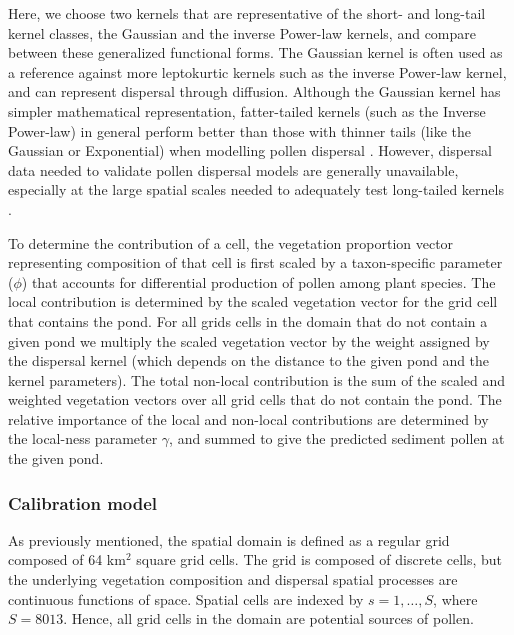 \documentclass[12pt]{article}
\begin{document}
Here, we choose two kernels that are representative of the short- and
long-tail kernel classes, the Gaussian and the inverse Power-law
kernels, and compare between these generalized functional forms. The
Gaussian kernel is often used as a reference against more leptokurtic
kernels such as the inverse Power-law kernel, and can represent
dispersal through diffusion. Although the Gaussian kernel has simpler
mathematical representation, fatter-tailed kernels (such as the
Inverse Power-law) in general perform better than those with thinner
tails (like the Gaussian or Exponential) when modelling pollen
dispersal \citep{devaux2007modelling, austerlitz2004using}. However,
dispersal data needed to validate pollen dispersal models are
generally unavailable, especially at the large spatial scales needed
to adequately test long-tailed kernels \citep{clobert2012dispersal}.


To determine the contribution of a cell, the vegetation proportion
vector representing composition of that cell is first scaled by a
taxon-specific parameter ($\phi$) that accounts for differential
production of pollen among plant species. The local contribution is
determined by the scaled vegetation vector for the grid cell that
contains the pond. For all grids cells in the domain that do not
contain a given pond we multiply the scaled vegetation vector by the
weight assigned by the dispersal kernel (which depends on the distance
to the given pond and the kernel parameters). The total non-local
contribution is the sum of the scaled and weighted vegetation vectors
over all grid cells that do not contain the pond. The relative
importance of the local and non-local contributions are determined by
the local-ness parameter $\gamma$, and summed to give the predicted
sediment pollen at the given pond.

\subsubsection{Calibration model}

As previously mentioned, the spatial domain is defined as a regular
grid composed of 64 km$^2$ square grid cells. The grid is composed of
discrete cells, but the underlying vegetation composition and
dispersal spatial processes are continuous functions of space. Spatial
cells are indexed by $s=1,\ldots,S$, where $S=8013$. Hence, all grid
cells in the domain are potential sources of pollen.
\end{document}
